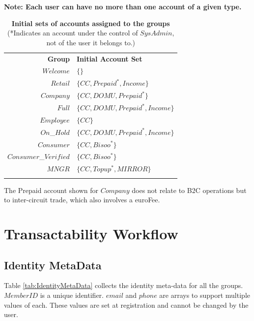 {\bf Note: Each user can have no more than one account of a given type.}

\begin{table}[h]
\vspace{-0.5cm}
\begin{centering}
\small
{
\begin{tabular}{ r | l  }
\hline
\textbf{Group}	& {\bf Initial Account Set} \\
\Xhline{1.5pt}
$Welcome$	& $\{ \}$ \\
\hline
$Retail$		& $\{ CC, Prepaid^*, Income \}$ \\
\hline
$Company$	& $\{ CC, DOMU, Prepaid^* \}$ \\
\hline
$Full$		& $\{ CC, DOMU, Prepaid^*, Income \}$ \\
\hline
$Employee$	& $\{ CC \}$ \\
\hline
$On$\_$Hold$	& $\{ CC, DOMU, Prepaid^*, Income \}$ \\
\hline
$Consumer$	& $\{ CC, Bisoo^* \}$ \\
\hline
$Consumer$\_$Verified$ & $\{ CC, Bisoo^* \}$ \\
\hline
$MNGR$ 		& $\{ CC, Topup^*, MIRROR \}$ \\
\Xhline{1.5pt}
\end{tabular}
}
\caption{\small\textbf{Initial sets of accounts assigned to the groups}\\ (*Indicates an account under the control of $SysAdmin$, not of the user it belongs to.)}
\label{tab:InitialAccountSets}
\end{centering}
\vspace{-1cm}
\end{table}

The Prepaid account shown for $Company$ does not relate to B2C operations but to inter-circuit trade, which also involves a euroFee.

\section{Transactability Workflow}
\subsection{Identity MetaData}
Table \ref{tab:IdentityMetaData} collects the identity meta-data for all the groups. $MemberID$ is a unique identifier. $email$ and $phone$ are arrays to support multiple values of each. These values are set at registration and cannot be changed by the user.

